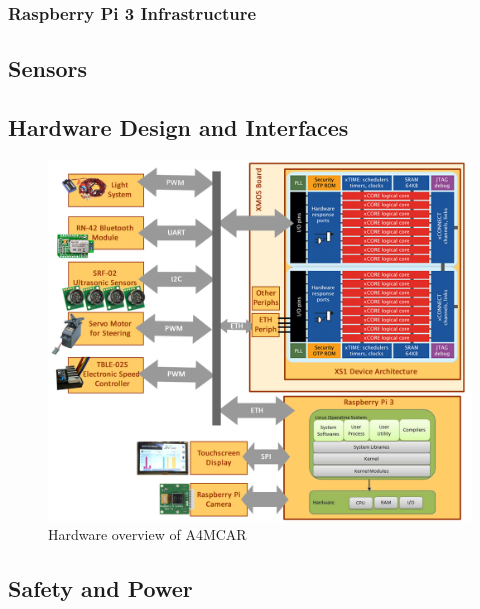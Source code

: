 \subsubsection{Raspberry Pi 3 Infrastructure}
\subsection{Sensors}
\subsection{Hardware Design and Interfaces}
\begin{figure}[htb]
	\includegraphics[scale=0.35]{content/images/hwoverview.png}
	\caption{Hardware overview of A4MCAR}
	\label{fig:hwoverview}
\end{figure}
\subsection{Safety and Power}
